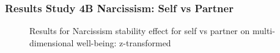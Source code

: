 \documentclass[
  singlecolumn]{article}
\begin{document}
\newpage{}

\subsubsection{Results Study 4B Narcissism: Self vs
Partner}\label{results-study-4b-narcissism-self-vs-partner}

\begin{figure}


\caption{\label{fig-results-narcissism-self}Results for Narcissism
stability effect for self vs partner on multi-dimensional well-being:
z-transformed}

\end{figure}%

\newpage{}
\end{document}
